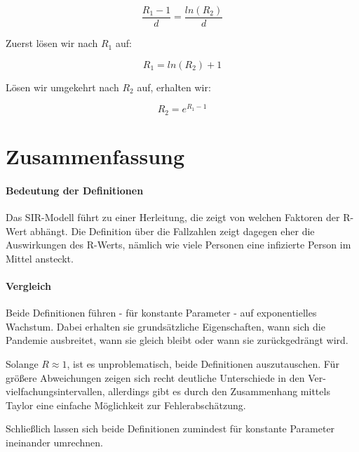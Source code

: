 \documentclass[a4paper]{article}
\begin{document}
    $$ \frac{R_1 - 1}{d} = \frac{ln(R_2)}{d} $$

    Zuerst lösen wir nach $R_1$ auf:

    \begin{equation}
        R_1 = ln(R_2) + 1
    \end{equation}

    Lösen wir umgekehrt nach $R_2$ auf, erhalten wir: 

    \begin{equation}
        R_2 = e^{R_1 - 1}
    \end{equation}

    \section{Zusammenfassung}
    \paragraph{Bedeutung der Definitionen}Das SIR-Modell führt zu einer Herleitung, die zeigt von welchen Faktoren der R-Wert abhängt. Die Definition über die Fallzahlen zeigt dagegen eher die Auswirkungen des R-Werts, nämlich wie viele Personen eine infizierte Person im Mittel ansteckt.
    
    \paragraph{Vergleich}Beide Definitionen führen - für konstante Parameter - auf exponentielles Wachstum. Dabei erhalten sie grundsätzliche Eigenschaften, wann sich die Pandemie ausbreitet, wann sie gleich bleibt oder wann sie zurückgedrängt wird. 

    Solange $R \approx 1$, ist es unproblematisch, beide Definitionen auszutauschen. Für größere Abweichungen zeigen sich recht deutliche Unterschiede in den Ver- vielfachungsintervallen, allerdings gibt es durch den Zusammenhang mittels Taylor eine einfache Möglichkeit zur Fehlerabschätzung. 

    Schließlich lassen sich beide Definitionen zumindest für konstante Parameter ineinander umrechnen. 





    \printbibliography
\end{document}
